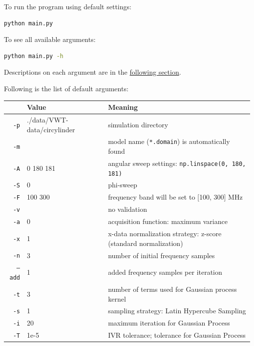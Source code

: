 

To run the program using default settings:
\begin{lstlisting}[language=bash]
python main.py
\end{lstlisting}

\noindent To see all available arguments:
\begin{lstlisting}[language=bash]
python main.py -h
\end{lstlisting}

\noindent Descriptions on each argument are in the \hyperref[SEC:args]{following section}.

\noindent Following is the list of default arguments:\\
\begin{tabular}{r | l | l}
  \hline \hline
   & Value & Meaning \\
  \hline
  \texttt{-p} & ./data/VWT-data/circylinder & simulation directory \\
  \texttt{-m} &   & model name (\texttt{*.domain}) is automatically found \\
  \texttt{-A} & 0 180 181 & angular sweep settings: \texttt{np.linspace(0, 180, 181)} \\
  \texttt{-S} & 0 & phi-sweep \\
  \texttt{-F} & 100 300 & frequency band will be set to [100, 300] MHz \\
  \texttt{-v} &   & no validation \\
  \texttt{-a} & 0 & acquisition function: maximum variance \\
  \texttt{-x} & 1 & x-data normalization strategy: z-score (standard normalization) \\
  \texttt{-n} & 3 & number of initial frequency samples \\
  \texttt{--add} & 1 & added frequency samples per iteration \\
  \texttt{-t} & 3 & number of terms used for Gaussian process kernel \\
  \texttt{-s} & 1 & sampling strategy: Latin Hypercube Sampling \\
  \texttt{-i} & 20 & maximum iteration for Gaussian Process \\
  \texttt{-T} & 1e-5 & IVR tolerance; tolerance for Gaussian Process \\
  \hline \hline
\end{tabular}